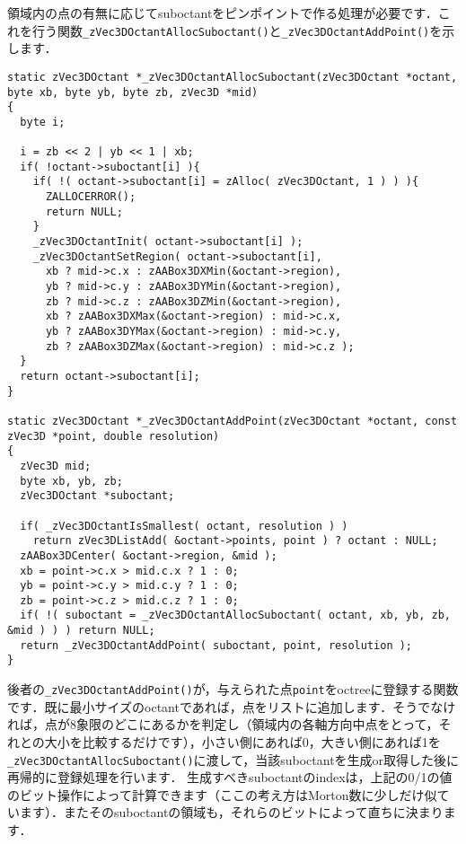 ﻿\documentclass[a4paper]{jsarticle}
\begin{document}
領域内の点の有無に応じてsuboctantをピンポイントで作る処理が必要です．これを行う関数\verb|_zVec3DOctantAllocSuboctant()|と\verb|_zVec3DOctantAddPoint()|を示します．
\begin{screen}
\begin{verbatim}
static zVec3DOctant *_zVec3DOctantAllocSuboctant(zVec3DOctant *octant, byte xb, byte yb, byte zb, zVec3D *mid)
{
  byte i;

  i = zb << 2 | yb << 1 | xb;
  if( !octant->suboctant[i] ){
    if( !( octant->suboctant[i] = zAlloc( zVec3DOctant, 1 ) ) ){
      ZALLOCERROR();
      return NULL;
    }
    _zVec3DOctantInit( octant->suboctant[i] );
    _zVec3DOctantSetRegion( octant->suboctant[i],
      xb ? mid->c.x : zAABox3DXMin(&octant->region),
      yb ? mid->c.y : zAABox3DYMin(&octant->region),
      zb ? mid->c.z : zAABox3DZMin(&octant->region),
      xb ? zAABox3DXMax(&octant->region) : mid->c.x,
      yb ? zAABox3DYMax(&octant->region) : mid->c.y,
      zb ? zAABox3DZMax(&octant->region) : mid->c.z );
  }
  return octant->suboctant[i];
}

static zVec3DOctant *_zVec3DOctantAddPoint(zVec3DOctant *octant, const zVec3D *point, double resolution)
{
  zVec3D mid;
  byte xb, yb, zb;
  zVec3DOctant *suboctant;

  if( _zVec3DOctantIsSmallest( octant, resolution ) )
    return zVec3DListAdd( &octant->points, point ) ? octant : NULL;
  zAABox3DCenter( &octant->region, &mid );
  xb = point->c.x > mid.c.x ? 1 : 0;
  yb = point->c.y > mid.c.y ? 1 : 0;
  zb = point->c.z > mid.c.z ? 1 : 0;
  if( !( suboctant = _zVec3DOctantAllocSuboctant( octant, xb, yb, zb, &mid ) ) ) return NULL;
  return _zVec3DOctantAddPoint( suboctant, point, resolution );
}
\end{verbatim}
\end{screen}

後者の\verb|_zVec3DOctantAddPoint()|が，与えられた点\verb|point|をoctreeに登録する関数です．既に最小サイズのoctantであれば，点をリストに追加します．そうでなければ，点が8象限のどこにあるかを判定し（領域内の各軸方向中点をとって，それとの大小を比較するだけです），小さい側にあれば0，大きい側にあれば1を\verb|_zVec3DOctantAllocSuboctant()|に渡して，当該suboctantを生成or取得した後に再帰的に登録処理を行います．
生成すべきsuboctantのindexは，上記の0/1の値のビット操作によって計算できます（ここの考え方はMorton数に少しだけ似ています）．またそのsuboctantの領域も，それらのビットによって直ちに決まります．
\end{document}
